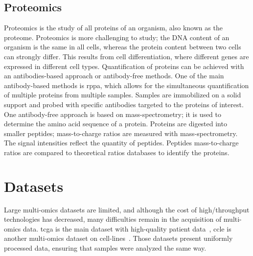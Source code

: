 \documentclass[../main.tex]{subfiles}
\begin{document}
	\subsection{Proteomics}\label{subsec:proteomics}
		Proteomics is the study of all proteins of an organism, also known as the proteome.
		Proteomics is more challenging to study; the DNA content of an organism is the same in all cells, whereas the protein content between two cells can strongly differ.
		This results from cell differentiation, where different genes are expressed in different cell types.
		Quantification of proteins can be achieved with an antibodies-based approach or antibody-free methods.
		One of the main antibody-based methods is \gls{rppa}, which allows for the simultaneous quantification of multiple proteins from multiple samples.
		Samples are immobilized on a solid support and probed with specific antibodies targeted to the proteins of interest.
		One antibody-free approach is based on mass-spectrometry; it is used to determine the amino acid sequence of a protein.
		Proteins are digested into smaller peptides; mass-to-charge ratios are measured with mass-spectrometry.
		The signal intensities reflect the quantity of peptides.
		Peptides mass-to-charge ratios are compared to theoretical ratios databases to identify the proteins.

\section{Datasets}
	Large multi-omics datasets are limited, and although the cost of high\-/throughput technologies has decreased, many difficulties remain in the acquisition of multi-omics data.
	\Gls{tcga} is the main dataset with high-quality patient data~\cite{TCGA}, \gls{ccle} is another multi-omics dataset on cell-lines~\cite{CCLE}.
	Those datasets present uniformly processed data, ensuring that samples were analyzed the same way.
\end{document}
